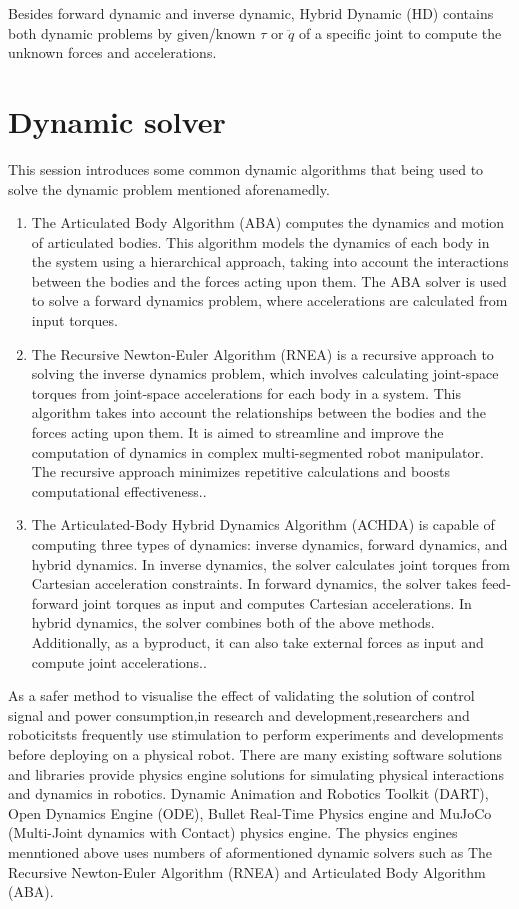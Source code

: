 \documentclass[report.tex]{subfiles}
\begin{document}
    Besides forward dynamic and inverse dynamic, Hybrid Dynamic (HD) contains both dynamic problems by given/known $\tau$ or $\ddot{q}$ of a specific joint to compute the unknown forces and accelerations.
    \section{Dynamic solver}
    This session introduces some common dynamic algorithms that being used to solve the dynamic problem mentioned aforenamedly.
    \begin{enumerate}

    \item
    The Articulated Body Algorithm (ABA)  computes the dynamics and motion of articulated bodies. This algorithm models the dynamics of each body in the system using a hierarchical approach, taking into account the interactions between the bodies and the forces acting upon them. The ABA solver is used to solve a forward dynamics problem, where accelerations are calculated from input torques\cite{featherstone1999divide}. 
    \item
    The Recursive Newton-Euler Algorithm (RNEA) is a recursive approach to solving the inverse dynamics problem, which involves calculating joint-space torques from joint-space accelerations for each body in a system. This algorithm takes into account the relationships between the bodies and the forces acting upon them. It is aimed to streamline and improve the computation of dynamics in complex multi-segmented robot manipulator. The recursive approach minimizes repetitive calculations and boosts computational effectiveness.\cite{featherstone2007book}.
    \item
    The Articulated-Body Hybrid Dynamics Algorithm (ACHDA) is capable of computing three types of dynamics: inverse dynamics, forward dynamics, and hybrid dynamics. In inverse dynamics, the solver calculates joint torques from Cartesian acceleration constraints. In forward dynamics, the solver takes feed-forward joint torques as input and computes Cartesian accelerations. In hybrid dynamics, the solver combines both of the above methods. Additionally, as a byproduct, it can also take external forces as input and compute joint accelerations.\cite{featherstone2007book}. 
    \end{enumerate}
    As a safer method to visualise the effect of validating the solution of control signal and power consumption,in research and development,researchers and roboticitsts frequently use stimulation to perform experiments and developments before deploying on a physical robot. There are many existing software solutions and libraries provide physics engine solutions for simulating physical interactions and dynamics in robotics. Dynamic Animation and Robotics Toolkit (DART)\cite{Lee2018}, Open Dynamics Engine (ODE)\cite{ODE}, Bullet Real-Time Physics engine\cite{Admin_2022} and MuJoCo (Multi-Joint dynamics with Contact) physics engine\cite{MuJoCo}. The physics engines menntioned above uses numbers of aformentioned dynamic solvers such as The Recursive Newton-Euler Algorithm (RNEA) and Articulated Body Algorithm (ABA).
    
\end{document}
